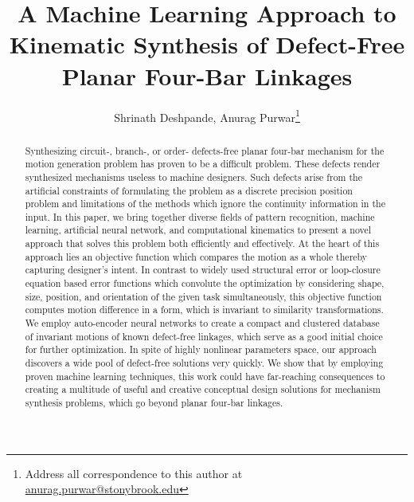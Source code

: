 \documentclass[twocolumn,10pt]{asme2ej}
\title{A Machine Learning Approach to Kinematic Synthesis of Defect-Free Planar Four-Bar Linkages}
\author{Shrinath Deshpande,
    {\tensfb Anurag Purwar\thanks{Address all correspondence to this author at \href{anurag.purwar@stonybrook.edu}{anurag.purwar@stonybrook.edu}}}
    \affiliation{
    Computer-Aided Design and Innovation Lab\\
    Department of Mechanical Engineering\\
    Stony Brook University\\
    Stony Brook, New York, 11794-2300
    }
}
\begin{document}
\maketitle

\begin{abstract}
Synthesizing  circuit-, branch-, or order- defects-free planar four-bar mechanism for the motion generation problem has proven to be a difficult problem. These defects render synthesized mechanisms useless to machine designers. Such defects arise from the artificial constraints of formulating the problem as a discrete precision position problem and limitations of the methods which ignore the continuity information in the input. In this paper, we bring together diverse fields of pattern recognition, machine learning, artificial neural network, and computational kinematics to present a novel approach that solves this problem both efficiently and effectively. At the heart of this approach lies an objective function which compares the motion as a whole thereby capturing designer's intent.
In contrast to widely used structural error or loop-closure equation based error functions which convolute the optimization by considering shape, size, position, and orientation of the given task simultaneously, this objective function computes motion difference in a form, which is invariant to similarity transformations. We employ auto-encoder neural networks to create a compact and clustered database of invariant motions of known defect-free linkages, which serve as a good initial choice for further optimization. In spite of highly nonlinear parameters space, our approach discovers a wide pool of defect-free solutions very quickly. We show that by employing proven machine learning techniques, this work could have far-reaching consequences to creating a multitude of useful and creative conceptual design solutions for mechanism synthesis problems, which go beyond planar four-bar linkages.



\end{abstract}
\end{document}
